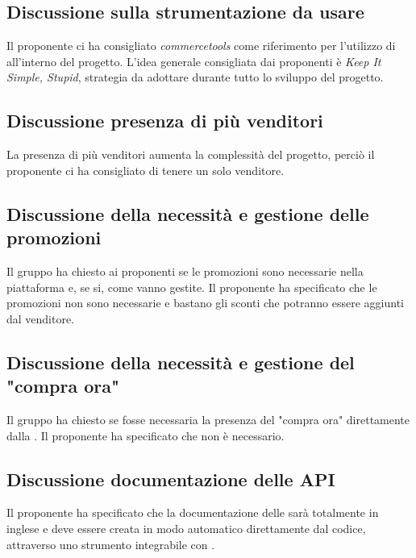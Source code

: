 \subsection{Discussione sulla strumentazione da usare}
Il proponente ci ha consigliato \textit{commercetools} come riferimento per l'utilizzo di  all'interno del progetto. L'idea generale consigliata dai proponenti è \textit{Keep It Simple, Stupid}, strategia da adottare durante tutto lo sviluppo del progetto.

\subsection{Discussione presenza di più venditori}
La presenza di più venditori aumenta la complessità del progetto, perciò il proponente ci ha consigliato di tenere un solo venditore.

\subsection{Discussione della necessità e gestione delle promozioni}
Il gruppo ha chiesto ai proponenti se le promozioni sono necessarie nella piattaforma e, se si, come vanno gestite.
Il proponente ha specificato che le promozioni non sono necessarie e bastano gli sconti che potranno essere aggiunti dal venditore.

\subsection{Discussione della necessità e gestione del "compra ora"}
Il gruppo ha chiesto se fosse necessaria la presenza del "compra ora" direttamente dalla .
Il proponente ha specificato che non è necessario.

\subsection{Discussione documentazione delle API}
Il proponente ha specificato che la documentazione delle  sarà totalmente in inglese e deve essere creata in modo automatico direttamente dal codice, attraverso uno strumento integrabile con .

